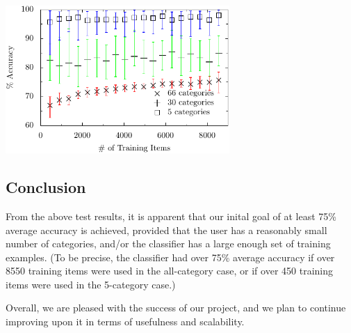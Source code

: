 \documentclass[letterpaper]{article}
\begin{document}
\noindent\includegraphics[width=3.35in]{data.pdf}

\subsection{Conclusion}
From the above test results, it is apparent that our inital goal of at least 75\% average accuracy is achieved, provided that the user has a reasonably small number of categories, and/or the classifier has a large enough set of training examples. (To be precise, the classifier had over 75\% average accuracy if over 8550 training items were used in the all-category case, or if over 450 training items were used in the 5-category case.)

Overall, we are pleased with the success of our project, and we plan to continue improving upon it in terms of usefulness and scalability.



\end{document}
